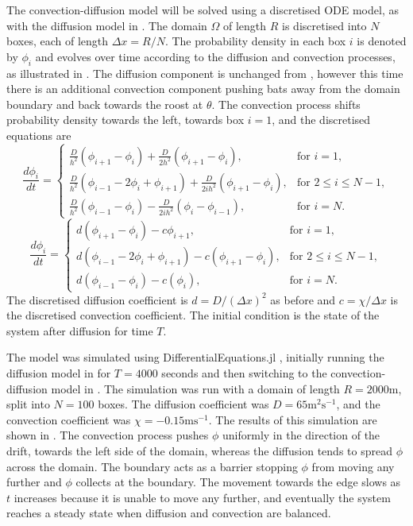 The convection-diffusion model will be solved using a discretised ODE model, as with the diffusion model in . The domain $\Omega$ of length $R$ is discretised into $N$ boxes, each of length $\Delta x = R/N$. The probability density in each box $i$ is denoted by $\phi_i$ and evolves over time according to the diffusion and convection processes, as illustrated in . The diffusion component is unchanged from , however this time there is an additional convection component pushing bats away from the domain boundary and back towards the roost at $\theta$. The convection process shifts probability density towards the left, towards box $i = 1$, and the discretised equations are
%
  \begin{equation}
  \frac{d\phi_i}{dt} = \begin{cases}
  		\frac{D}{h^2}(\phi_{i+1} - \phi_{i}) + \frac{D}{2h^2} (\phi_{i+1}-\phi_i), & \text{for } i = 1, \\
  		\frac{D}{h^2}(\phi_{i-1}-2\phi_i +\phi_{i+1}) + \frac{D}{2ih^2} (\phi_{i+1}-\phi_{i}), & \text{for } 2 \leq i \leq N-1, \\
  		\frac{D}{h^2}(\phi_{i-1}-\phi_i) - \frac{D}{2ih^2} (\phi_{i}-\phi_{i-1}), & \text{for } i = N .
  		\end{cases}
          \label{eqn:discrete_diffusion2d}
  \end{equation}
%
%
\begin{equation}
\frac{d\phi_i}{dt} = \begin{cases}
		d(\phi_{i+1} - \phi_i) - c \phi_{i+1}, & \text{for } i = 1, \\
		d(\phi_{i-1}-2\phi_i +\phi_{i+1}) - c(\phi_{i+1}-\phi_{i}), & \text{for } 2 \leq i \leq N-1, \\
		d(\phi_{i-1}-\phi_i) - c(\phi_{i}), & \text{for } i = N.
		\end{cases}
        \label{eqn:discrete_convection}
\end{equation}
%
The discretised diffusion coefficient is $d = D/(\Delta x)^2$ as before and $c=\chi/\Delta x$ is the discretised convection coefficient. The initial condition is the state of the system after diffusion for time $T$.

The model was simulated using DifferentialEquations.jl \cite{DifferentialEquations}, initially running the
diffusion model in  for $T = 4000$ seconds and
then switching to the convection-diffusion model in . The
simulation was run with a domain of length $R = 2000$m, split into $N = 100$
boxes. The diffusion coefficient was $D = 65\mathrm{m^2s^{-1}}$, and the convection coefficient
was $\chi =  - 0.15\mathrm{ms^{-1}}$. The results
of this simulation are shown in . The convection process pushes $\phi$ uniformly in the direction of the drift, towards the left side of the domain, whereas the diffusion tends to spread $\phi$ across the domain. The boundary acts as a barrier stopping $\phi$ from moving any further and $\phi$ collects at the boundary. The movement towards the edge slows as $t$ increases because it is unable to move any further, and eventually the system reaches a steady state when diffusion and convection are balanced.

